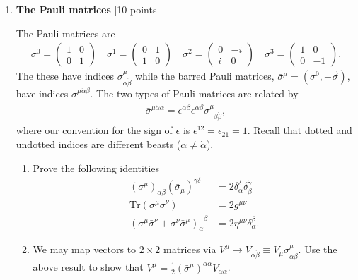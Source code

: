 \documentclass[12pt]{article}
\begin{document}
\begin{enumerate}
\item {\bf The Pauli matrices} [10 points]

The Pauli matrices are
\begin{align*}
	\sigma^0 = 
	\begin{pmatrix}
		1 & 0\\
		0 & 1
	\end{pmatrix}
	\quad
	\sigma^1 = 
	\begin{pmatrix}
		0 & 1\\
		1 & 0
	\end{pmatrix}
	\quad
	\sigma^2 = 
	\begin{pmatrix}
		0 & -i\\
		i & 0
	\end{pmatrix}
	\quad
	\sigma^3 = 
	\begin{pmatrix}
		1 & 0\\
		0 & -1
	\end{pmatrix}.
\end{align*}
The these have indices $\sigma^\mu_{\alpha\dot{\beta}}$ while the barred Pauli matrices, $\bar{\sigma}^\mu = (\sigma^0, -\vec\sigma)$, have indices $\bar{\sigma}^{\mu\dot{\alpha}\beta}$. The two types of Pauli matrices are related by
\begin{align}
	\bar\sigma^{\mu\dot\alpha\alpha} = \epsilon^{\dot\alpha\dot\beta}\epsilon^{\alpha\beta}\sigma^\mu_{\phantom{\mu}\beta\dot\beta},
\end{align}
where our convention for the sign of $\epsilon$ is $\epsilon^{12} = \epsilon_{21} = 1$. Recall that dotted and undotted indices are different beasts ($\alpha \neq \dot\alpha$).

\begin{enumerate}
\item Prove the following identities
\begin{align*}
 (\sigma^\mu)_{\alpha\dot\beta} (\bar\sigma_\mu)^{\dot\gamma\delta} &= 2\delta^\delta_\alpha \delta^{\dot\gamma}_\beta\\
 \text{Tr}(\sigma^\mu\bar\sigma^\nu) &= 2g^{\mu\nu}\\
 (\sigma^\mu \bar\sigma^\nu + \sigma^\nu\bar\sigma^\mu)^{\phantom{\alpha}\beta}_{\alpha} &= 2\eta^{\mu\nu}\delta^\beta_\alpha.
\end{align*}

\item We may map vectors to $2\times2$ matrices via $V^\mu \to V_{\alpha\dot\beta} \equiv V_\mu \sigma^\mu_{\alpha\dot\beta}$. Use the above result to show that $V^\mu = \frac 12 (\bar\sigma^\mu)^{\dot\alpha\alpha}V_{\alpha\dot\alpha}$.


\end{enumerate}
\end{enumerate}
\end{document}
